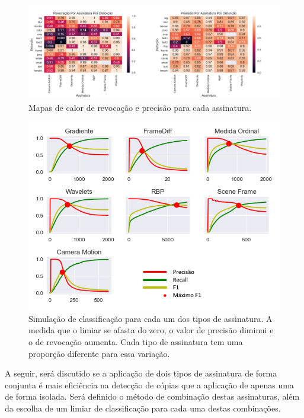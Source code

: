 \begin{figure}[h]
	\centering
	\caption{Mapas de calor de revocação e precisão para cada assinatura.}
	\label{fig:heatmap-lado-a-lado}
	\includegraphics[width=\textwidth]{dados/figuras/experimentos/heatmap_lado.png}
\end{figure}

\begin{figure}[h]
	\centering
	\caption{Simulação de classificação para cada um dos tipos de assinatura. A medida que o limiar se afasta do zero, o valor de precisão diminui e o de revocação aumenta. Cada tipo de assinatura tem uma proporção diferente para essa variação.}
	\label{fig:todos-limiares}
	\includegraphics[width=\textwidth]{dados/figuras/experimentos/todos_final.png}
\end{figure}
 
A seguir, será discutido se a aplicação de dois tipos de assinatura de forma conjunta é mais eficiência na detecção de cópias que a aplicação de apenas uma de forma isolada. Será definido o método de combinação destas assinaturas, além da escolha de um limiar de classificação para cada uma destas combinações.

